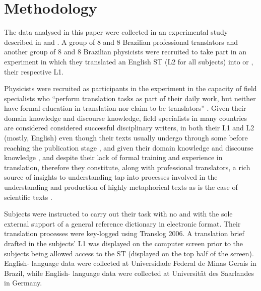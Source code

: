 \documentclass[output=paper]{LSP/langsci}
\begin{document}
\section{Methodology}

The data analysed in this paper were collected in an experimental study described in \citet{daSilva2012} and \citet{Alves2014Effortful}. A group of 8  and 8 Brazilian professional translators and another group of 8  and 8 Brazilian physicists were recruited to take part in an experiment in which they translated an English ST (L2 for all subjects) into  or , their respective L1. 

Physicists were recruited as participants in the experiment in the capacity of field specialists who ``perform translation tasks as part of their daily work, but neither have formal education in translation nor claim to be translators'' \citep[264]{Pagano2013}. Given their domain knowledge and discourse knowledge, field specialists in many countries are considered considered successful disciplinary writers, in both their L1 and L2 (mostly, English) even though their texts usually undergo through some  before reaching the publication stage \citep{Vasconcellos2007}, and given their domain knowledge and discourse knowledge \citep{Scardamalia1991}, and despite their lack of formal training and experience in translation, therefore they constitute, along with professional translators, a rich source of insights to understanding tap into processes involved in the understanding and production of highly metaphorical texts \citep{Pagano2010Text} as is the case of scientific texts \citep{Halliday2006}.

Subjects were instructed to carry out their task with no  and with the sole external support of a general reference dictionary in electronic format. Their translation processes were key-logged using Translog 2006. A translation brief drafted in the subjects' L1 was displayed on the computer screen prior to the subjects being allowed access to the ST (displayed on the top half of the screen). English- language data were collected at Universidade Federal de Minas Gerais in Brazil, while English- language data were collected at Universität des Saarlandes in Germany. 
\end{document}
